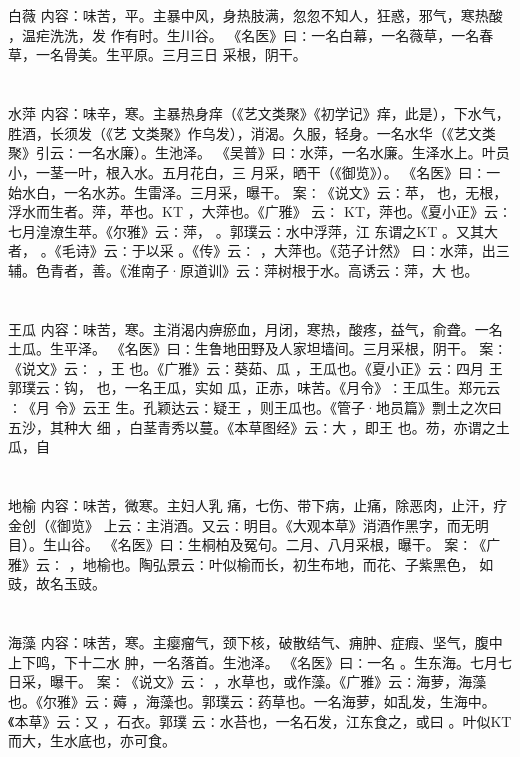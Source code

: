 \documentclass[12pt,UTF8]{ctexbook}
\begin{document}
\chapter{}白薇
内容：味苦，平。主暴中风，身热肢满，忽忽不知人，狂惑，邪气，寒热酸 ，温疟洗洗，发 
作有时。生川谷。 
《名医》曰∶一名白幕，一名薇草，一名春草，一名骨美。生平原。三月三日 
采根，阴干。 


\chapter{}水萍
内容：味辛，寒。主暴热身痒（《艺文类聚》《初学记》痒，此是），下水气，胜酒，长须发（《艺 
文类聚》作乌发），消渴。久服，轻身。一名水华（《艺文类聚》引云∶一名水廉）。生池泽。 
《吴普》曰∶水萍，一名水廉。生泽水上。叶员小，一茎一叶，根入水。五月花白，三 
月采，晒干（《御览》）。 
《名医》曰∶一始水白，一名水苏。生雷泽。三月采，曝干。 
案∶《说文》云∶苹， 也，无根，浮水而生者。萍，苹也。KT ，大萍也。《广雅》 
云∶ 
KT，萍也。《夏小正》云∶七月湟潦生苹。《尔雅》云∶萍， 。郭璞云∶水中浮萍，江 
东谓之KT 。又其大者， 。《毛诗》云∶于以采 。《传》云∶ ，大萍也。《范子计然》 
曰∶水萍，出三辅。色青者，善。《淮南子·原道训》云∶萍树根于水。高诱云∶萍，大 
也。 


\chapter{}王瓜
内容：味苦，寒。主消渴内痹瘀血，月闭，寒热，酸疼，益气，俞聋。一名土瓜。生平泽。 
《名医》曰∶生鲁地田野及人家坦墙间。三月采根，阴干。 
案∶《说文》云∶ ，王 也。《广雅》云∶葵茹、瓜 ，王瓜也。《夏小正》云∶四月 
王 
郭璞云∶钩， 也，一名王瓜，实如 瓜，正赤，味苦。《月令》∶王瓜生。郑元云∶《月 
令》云王 生。孔颖达云∶疑王 ，则王瓜也。《管子·地员篇》剽土之次曰五沙，其种大 
细 ，白茎青秀以蔓。《本草图经》云∶大 ，即王 也。芴，亦谓之土瓜，自 


\chapter{}地榆
内容：味苦，微寒。主妇人乳 痛，七伤、带下病，止痛，除恶肉，止汗，疗金创（《御览》 
上云∶主消酒。又云∶明目。《大观本草》消酒作黑字，而无明目）。生山谷。 
《名医》曰∶生桐柏及冤句。二月、八月采根，曝干。 
案∶《广雅》云∶ ，地榆也。陶弘景云∶叶似榆而长，初生布地，而花、子紫黑色， 
如豉，故名玉豉。 


\chapter{}海藻
内容：味苦，寒。主瘿瘤气，颈下核，破散结气、痈肿、症瘕、坚气，腹中上下鸣，下十二水 
肿，一名落首。生池泽。 
《名医》曰∶一名 。生东海。七月七日采，曝干。 
案∶《说文》云∶ ，水草也，或作藻。《广雅》云∶海萝，海藻也。《尔雅》云∶薅 
，海藻也。郭璞云∶药草也。一名海萝，如乱发，生海中。《本草》云∶又 ，石衣。郭璞 
云∶水苔也，一名石发，江东食之，或曰 。叶似KT 而大，生水底也，亦可食。 
\end{document}

